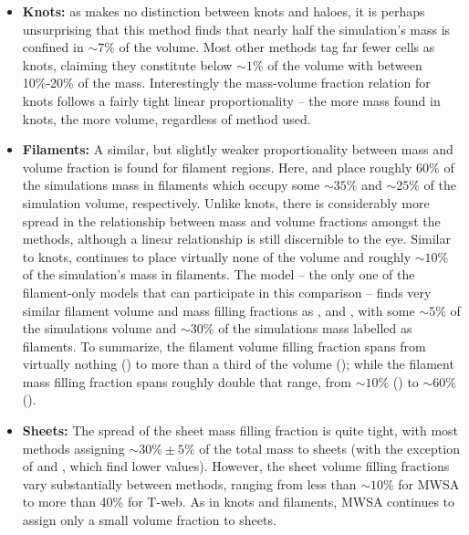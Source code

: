 \begin{itemize} 
\item {\bf Knots:} as \origami{} makes no distinction between knots and haloes, it is perhaps unsurprising that this method finds that nearly half the simulation's mass is confined in $\sim7\%$ of the volume. %
Most other methods tag far fewer cells as knots, claiming they constitute below $\sim1\%$ of the volume with between 10\%-20\% of the mass. Interestingly the mass-volume fraction relation for knots follows a fairly tight linear proportionality -- the more mass found in knots, the more volume, regardless of method used. 
\item {\bf Filaments:} A similar, but slightly weaker proportionality between mass and volume fraction is found for filament regions. Here, \spine{} and \disperse{} place roughly 60\% of the simulations mass in filaments which occupy some $\sim35\%$ and $\sim25\%$ of the simulation volume, respectively. Unlike knots, there is considerably more spread in the relationship between mass and volume fractions amongst the methods, although a linear relationship is still discernible to the eye. Similar to knots, \mswa{} continues to place virtually none of the volume and roughly $\sim10\%$ of the simulation's mass in filaments. The \bisous{} model -- the only one of the filament-only models that can participate in this comparison -- finds very similar filament volume and mass filling fractions as \classic{},  \vweb{} and \mmft{}, with some $\sim5\%$ of the simulations volume and $\sim30\%$ of the simulations mass labelled as filaments. To summarize, the filament volume filling fraction spans from virtually nothing (\mswa{}) to more than a third of the volume (\spine{}); while the filament mass filling fraction spans roughly double that range, from $\sim10\%$ (\mswa{}) to $\sim60\%$ (\disperse{}).
\item {\bf Sheets:} The spread of the sheet mass filling fraction is quite tight, with most methods assigning $\sim30\%\pm5\%$ of the total mass to sheets (with the exception of \origami{} and \mmft{}, which find lower values). However, the sheet volume filling fractions vary substantially between methods, ranging from less than $\sim10\%$ for MWSA to more than 40\% for T-web. As in knots and filaments, MWSA continues to assign only a small volume fraction to sheets.

\end{itemize}

